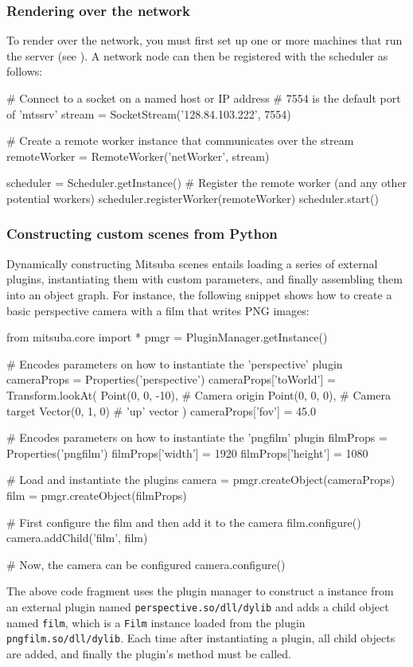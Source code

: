 \subsubsection{Rendering over the network}
To render over the network, you must first set up one or
more machines that run the  server (see ).
A network node can then be registered with the scheduler as follows:
\begin{python}
# Connect to a socket on a named host or IP address
# 7554 is the default port of 'mtssrv'
stream = SocketStream('128.84.103.222', 7554)

# Create a remote worker instance that communicates over the stream
remoteWorker = RemoteWorker('netWorker', stream)

scheduler = Scheduler.getInstance()
# Register the remote worker (and any other potential workers)
scheduler.registerWorker(remoteWorker)
scheduler.start()
\end{python}

\subsubsection{Constructing custom scenes from Python}
Dynamically constructing Mitsuba scenes entails loading a series of external 
plugins, instantiating them with custom parameters, and finally assembling 
them into an object graph. 
For instance, the following snippet shows how to create a basic
perspective camera with a film that writes PNG images:
\begin{python}
from mitsuba.core import *
pmgr = PluginManager.getInstance()

# Encodes parameters on how to instantiate the 'perspective' plugin
cameraProps = Properties('perspective')
cameraProps['toWorld'] = Transform.lookAt(
	Point(0, 0, -10),  # Camera origin
	Point(0, 0, 0),    # Camera target
	Vector(0, 1, 0)    # 'up' vector
)
cameraProps['fov'] = 45.0

# Encodes parameters on how to instantiate the 'pngfilm' plugin
filmProps = Properties('pngfilm')
filmProps['width'] = 1920
filmProps['height'] = 1080

# Load and instantiate the plugins
camera = pmgr.createObject(cameraProps)
film = pmgr.createObject(filmProps)

# First configure the film and then add it to the camera
film.configure()
camera.addChild('film', film)

# Now, the camera can be configured
camera.configure()
\end{python}
The above code fragment uses the plugin manager to construct a 
 instance from an external plugin named 
\texttt{perspective.so/dll/dylib} and adds a child object
named \texttt{film}, which is a \texttt{Film} instance loaded from the
plugin \texttt{pngfilm.so/dll/dylib}.
Each time after instantiating a plugin, all child objects are added, and
finally the  plugin's  method must be called.

